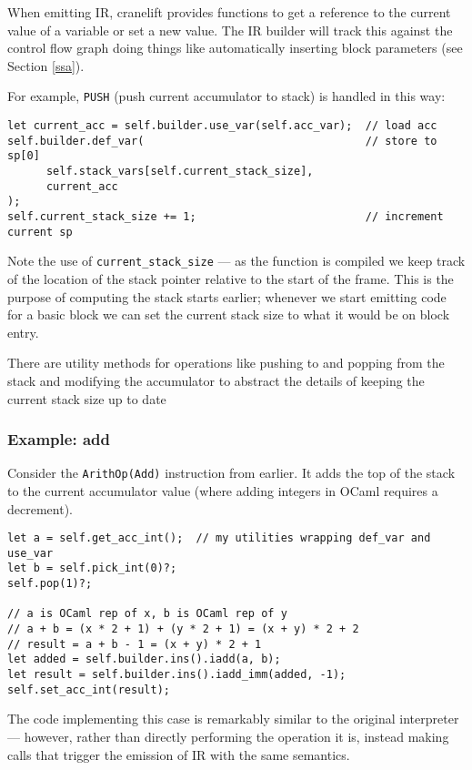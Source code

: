 When emitting IR, cranelift provides functions to get a reference to the current value of a
variable
or set a new value.  The IR builder will track this against the control flow graph doing things
like automatically inserting block parameters (see Section \ref{ssa}).

For example, \texttt{PUSH} (push current accumulator to stack) is handled in this way:

\begin{verbatim}
let current_acc = self.builder.use_var(self.acc_var);  // load acc
self.builder.def_var(                                  // store to sp[0]
      self.stack_vars[self.current_stack_size],
      current_acc
);
self.current_stack_size += 1;                          // increment current sp
\end{verbatim}

Note the use of \texttt{current\_stack\_size} --- as the function is compiled we keep track of the
location of the stack pointer relative to the start of the frame. This is the purpose of computing
the stack starts earlier; whenever we start emitting code for a basic block we can set the current
stack size to what it would be on block entry.

There are utility methods for operations like pushing to and popping from the stack and modifying
the accumulator to abstract the details of keeping the current stack size up to date

\subsubsection{Example: add}

Consider the \texttt{ArithOp(Add)} instruction from earlier. It adds the top of the stack to the
current accumulator value (where adding integers in OCaml requires a decrement).

\begin{verbatim}
let a = self.get_acc_int();  // my utilities wrapping def_var and use_var
let b = self.pick_int(0)?;
self.pop(1)?;

// a is OCaml rep of x, b is OCaml rep of y
// a + b = (x * 2 + 1) + (y * 2 + 1) = (x + y) * 2 + 2
// result = a + b - 1 = (x + y) * 2 + 1
let added = self.builder.ins().iadd(a, b);
let result = self.builder.ins().iadd_imm(added, -1);
self.set_acc_int(result);
\end{verbatim}

The code implementing this case is remarkably similar to the original interpreter --- however,
rather
than directly performing the operation it is, instead making calls that trigger the emission of IR
with the same semantics.

